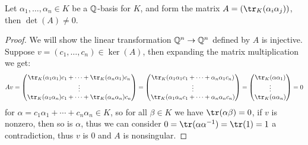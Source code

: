 \documentclass{article}
\begin{document}
\begin{lemma}
    Let $\alpha_1,\ldots,\alpha_n\in K$ be a $\mathbb{Q}$-basis for $K$, and form the matrix $A = (\tr_K(\alpha_i\alpha_j))$, then $\det(A)\neq 0$.
    \begin{proof}
        We will show the linear transformation $\mathbb{Q}^n\rightarrow \mathbb{Q}^n$ defined by $A$ is injective. Suppose $v=(c_1,\ldots,c_n)\in\ker(A)$, then expanding the matrix multiplication we get: \[
        Av = \begin{pmatrix}
            \tr_K(\alpha_1\alpha_1)c_1 + \cdots + \tr_K(\alpha_n\alpha_1)c_n \\
            \vdots \\
            \tr_K(\alpha_1\alpha_n)c_1 + \cdots + \tr_K(\alpha_n\alpha_n)c_n \\
        \end{pmatrix} = \begin{pmatrix}
            \tr_K(\alpha_1\alpha_1c_1 + \cdots + \alpha_n\alpha_1 c_n) \\
            \vdots \\
            \tr_K(\alpha_1\alpha_nc_1 + \cdots + \alpha_n\alpha_n c_n) \\
        \end{pmatrix}  = \begin{pmatrix}
            \tr_K(\alpha \alpha_1) \\
            \vdots \\
            \tr_K(\alpha \alpha_n)
        \end{pmatrix} = 0
        \] for $\alpha=c_1\alpha_1 + \cdots + c_n\alpha_n\in K$, so for all $\beta \in K$ we have $\tr(\alpha\beta)=0$, if $v$ is nonzero, then so is $\alpha$, thus we can consider $0=\tr(\alpha\alpha^{-1}) = \tr(1)=1$ a contradiction, thus $v$ is $0$ and $A$ is nonsingular.
    \end{proof}
\end{lemma}
\end{document}
